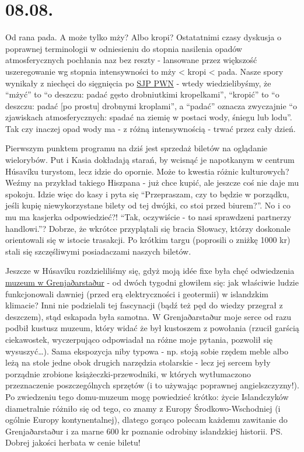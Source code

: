 \chapter{08.08.}

Od rana pada. A może tylko mży? Albo kropi? Ostatatnimi czasy dyskusja o poprawnej terminologii w odniesieniu do stopnia nasilenia opadów atmosferycznych pochłania naz bez reszty - lansowane przez większość uszeregowanie wg stopnia intensywności to mży < kropi < pada. Nasze spory wynikały z niechęci do sięgnięcia po \href{http://sjp.pwn.pl/}{SJP PWN} - wtedy wiedzielibyśmy, że “mżyć” to “o deszczu: padać gęsto drobniutkimi kropelkami”, “kropić” to “o deszczu: padać [po prostu] drobnymi kroplami”, a “padać” oznacza zwyczajnie “o zjawiskach atmosferycznych: spadać na ziemię w postaci wody, śniegu lub lodu”. Tak czy inaczej opad wody ma - z różną intensywnością - trwać przez cały dzień.

Pierwszym punktem programu na dziś jest sprzedaż biletów na oglądanie wielorybów. Put i Kasia dokładają starań, by wcisnąć je napotkanym w centrum Húsavíku turystom, lecz idzie do opornie. Może to kwestia różnic kulturowych? Weźmy na przykład takiego Hiszpana - już chce kupić, ale jeszcze coś nie daje mu spokoju. Idzie więc do kasy i pyta się “Przepraszam, czy to będzie w porządku, jeśli kupię niewykorzystane bilety od tej dwójki, co stoi przed biurem?”. No i co mu ma kasjerka odpowiedzieć?! “Tak, oczywiście - to nasi sprawdzeni partnerzy handlowi.”? Dobrze, że wkrótce przyplątali się bracia Słowacy, którzy doskonale orientowali się w istocie trasakcji. Po krótkim targu (poprosili o zniżkę 1000 kr) stali się szczęśliwymi posiadaczami naszych biletów.


Jeszcze w Húsavíku rozdzieliliśmy się, gdyż moją idée fixe była chęć odwiedzenia \href{http://www.visithusavik.com/attractions/the-turf-house-museum/}{muzeum w Grenjaðarstaður} - od dwóch tygodni głowiłem się: jak właściwie ludzie funkcjonowali dawniej (przed erą elektryczności i geotermii) w islandzkim klimacie? Inni nie podzielali tej fascynacji (bądź też pęd do wiedzy przegrał z deszczem), stąd eskapada była samotna. W Grenjaðarstaður moje serce od razu podbił kustusz muzeum, który widać że był kustoszem z powołania (rzucił garścią ciekawostek, wyczerpująco odpowiadał na różne moje pytania, pozwolił się wysuszyć…). Sama ekspozycja niby typowa - np. stoją sobie rzędem meble albo leżą na stole jedne obok drugich narzędzia stolarskie - lecz jej sercem były porządnie zrobione książeczki-przewodniki, w których wytłumaczono przeznaczenie poszczególnych sprzętów (i to używając poprawnej angielszczyzny!). Po zwiedzeniu tego domu-muzeum mogę powiedzieć krótko: życie Islandczyków diametralnie różniło się od tego, co znamy z Europy Środkowo-Wschodniej (i ogólnie Europy kontynentalnej), dlatego gorąco polecam każdemu zawitanie do Grenjaðarstaður i za marne 600 kr poznanie odrobiny islandzkiej historii. PS. Dobrej jakości herbata w cenie biletu!

